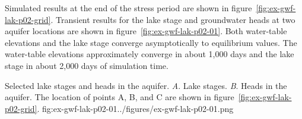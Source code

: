 Simulated results at the end of the stress period are shown in figure~\ref{fig:ex-gwf-lak-p02-grid}. Transient results for the lake stage and groundwater heads at two aquifer locations are shown in figure~\ref{fig:ex-gwf-lak-p02-01}. Both water-table elevations and the lake stage converge asymptotically to equilibrium values. The water-table elevations approximately converge in about 1,000 days and the lake stage in about 2,000 days of simulation time.

\begin{StandardFigure}{
                                     Selected lake stages and heads in the aquifer. 
                                     \textit{A}. Lake stages. \textit{B}. Heads in the aquifer. 
                                     The location of points A, B, and C are shown in 
                                     figure~\ref{fig:ex-gwf-lak-p02-grid}.
                                     }{fig:ex-gwf-lak-p02-01}{../figures/ex-gwf-lak-p02-01.png}
\end{StandardFigure}                                 
